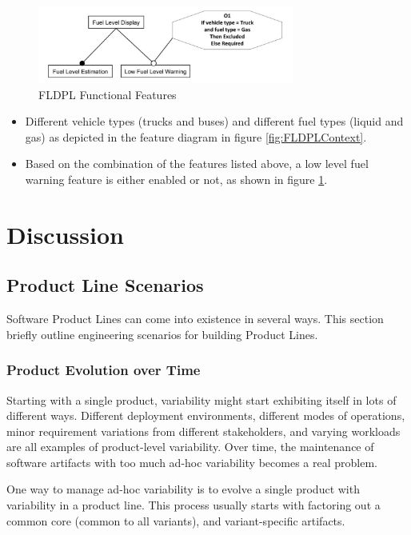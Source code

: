 \documentclass[11pt]{article}
\begin{document}
 \begin{figure}
  \centering
  \includegraphics[width=0.75\textwidth]{FLDPLFeatures}
  \caption{FLDPL Functional Features}
  \label{fig:FLDPLFeatures}
\end{figure}

 \begin{itemize}
 
 \item Different vehicle types (trucks and buses) and different fuel types (liquid and gas) as depicted in the feature diagram in figure \ref{fig:FLDPLContext}.
 \item Based on the combination of the features listed above, a low level fuel warning feature is either enabled or not, as shown in figure \ref{fig:FLDPLFeatures}.
 
 \end{itemize}
 
\section{Discussion}

\subsection{Product Line Scenarios}

Software Product Lines can come into existence in several ways. This section briefly outline engineering scenarios for building Product Lines.

\subsubsection{Product Evolution over Time}

Starting with a single product, variability might start exhibiting itself in lots of different ways. Different deployment environments, different modes of operations, minor requirement variations from different stakeholders, and varying workloads are all examples of product-level variability. Over time, the maintenance of software artifacts with too much ad-hoc variability becomes a real problem. 

One way to manage ad-hoc variability is to evolve a single product with variability in a product line. This process usually starts with factoring out a common core (common to all variants), and variant-specific artifacts.
\end{document}
